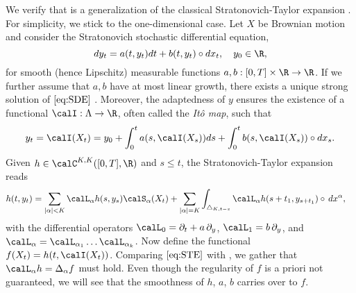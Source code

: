 

\begin{example} \label{ex:classicTaylor}
We verify that  is a generalization of %
the classical Stratonovich-Taylor expansion \cite[Theorem~5.6.1.]{KP}. For simplicity, we stick to the one-dimensional case. Let $X$ be Brownian motion and consider the Stratonovich stochastic differential equation, 
\begin{equation}\label{eq:SDE}
    dy_t = a(t,y_t)dt + b(t,y_t) \circ dx_t, \quad y_0 \in \R,
\end{equation}
for smooth (hence Lipschitz) measurable functions $a,b: [0,T]\times \R \to \R$. If we further assume that $a,b$ have   %
 at most linear growth, there exists a unique strong solution of $\eqref{eq:SDE}$ \cite[Theorem~4.5.3.]{KP}.
 Moreover, the adaptedness of $y$ %
 ensures the existence of a functional $\calI:\Lambda\to \R$, often called the \textit{Itô map}, such that 
\begin{equation}\label{eq:SDEFunc}
    y_t = \calI(X_t)  = y_0 + \int_0^t a(s,\calI(X_s))ds +  \int_0^t b(s,\calI(X_s)) \circ dx_s.
\end{equation}
Given $h \in \calC^{K,K}([0,T],\R)$ and $s\le t$, the Stratonovich-Taylor expansion  reads
\begin{align}\label{eq:STE}
    h(t,y_t) &= \sum_{|\alpha|< K}  \calL_{\alpha}h(s,y_s) \calS_{\alpha}(X_t) + \sum_{|\alpha| = K} \int_{\triangle_{K,t-s}} \calL_{\alpha}h(s+t_1,y_{s+t_1})\circ \, dx^{\alpha},
\end{align}
with the differential operators $\calL_0 = \partial_t + a \,\partial_y$, $\calL_1=b\, \partial_y$, and $\calL_{\alpha} =\calL_{\alpha_1}\ldots \calL_{\alpha_k}$. Now define the functional $f(X_t) = h(t,\calI(X_t))$. Comparing $\eqref{eq:STE}$ with  , we gather that  $\calL_{\alpha}h = \Delta_\alpha f$ must hold. Even though the regularity of $f$ is a priori not guaranteed, we will see that the smoothness of $h$, $a$, $b$ carries over to $f$. 


\end{example}
